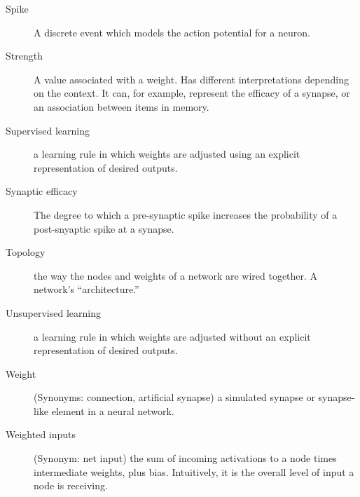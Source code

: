 \begin{description}
\item[Spike] A discrete event which models the action potential for a neuron.
\item[Strength] A value associated with a weight. Has different interpretations depending on the context. It can, for example, represent the efficacy of a synapse, or an association between items in memory.
\item[Supervised learning] a learning rule in which weights are adjusted using an explicit representation of desired outputs.
\item[Synaptic efficacy] The degree to which a pre-synaptic spike increases the probability of a post-snyaptic spike at a synapse.
\item[Topology] the way the nodes and weights of a network are wired together. A network's ``architecture.''
\item[Unsupervised learning] a learning rule in which weights are adjusted without an explicit representation of desired outputs.
\item[Weight] (Synonyms: connection, artificial synapse) a simulated synapse or synapse-like element in a neural network. 
\item[Weighted inputs] (Synonym: net input) the sum of incoming activations to a node times intermediate weights, plus bias. Intuitively, it is the overall level of input a node is receiving.
\end{description}